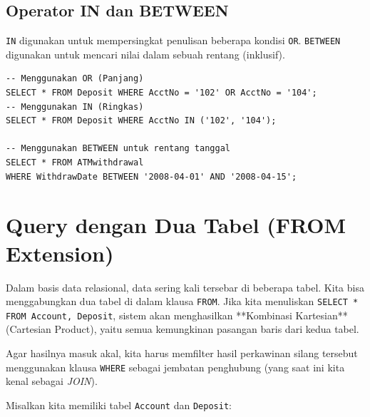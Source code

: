 \documentclass[11pt,a4paper]{article}
\begin{document}
\subsection{Operator IN dan BETWEEN}
\texttt{IN} digunakan untuk mempersingkat penulisan beberapa kondisi \texttt{OR}. \texttt{BETWEEN} digunakan untuk mencari nilai dalam sebuah rentang (inklusif).
\begin{lstlisting}
-- Menggunakan OR (Panjang)
SELECT * FROM Deposit WHERE AcctNo = '102' OR AcctNo = '104';
-- Menggunakan IN (Ringkas)
SELECT * FROM Deposit WHERE AcctNo IN ('102', '104');

-- Menggunakan BETWEEN untuk rentang tanggal
SELECT * FROM ATMwithdrawal
WHERE WithdrawDate BETWEEN '2008-04-01' AND '2008-04-15';
\end{lstlisting}

\section{Query dengan Dua Tabel (FROM Extension)}

Dalam basis data relasional, data sering kali tersebar di beberapa tabel. Kita bisa menggabungkan dua tabel di dalam klausa \texttt{FROM}. Jika kita menuliskan \texttt{SELECT * FROM Account, Deposit}, sistem akan menghasilkan **Kombinasi Kartesian** (Cartesian Product), yaitu semua kemungkinan pasangan baris dari kedua tabel.

Agar hasilnya masuk akal, kita harus memfilter hasil perkawinan silang tersebut menggunakan klausa \texttt{WHERE} sebagai jembatan penghubung (yang saat ini kita kenal sebagai \textit{JOIN}).

Misalkan kita memiliki tabel \texttt{Account} dan \texttt{Deposit}:
\end{document}
